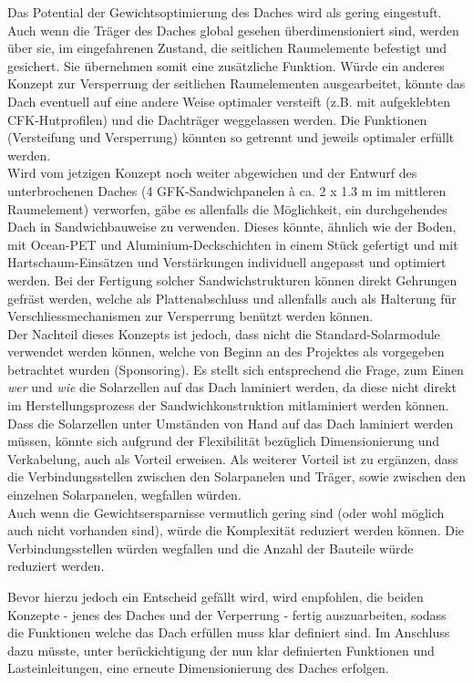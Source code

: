 Das Potential der Gewichtsoptimierung des Daches wird als gering eingestuft. Auch wenn die Träger des Daches global gesehen überdimensioniert sind, werden über sie, im eingefahrenen Zustand, die seitlichen Raumelemente befestigt und gesichert. Sie übernehmen somit eine zusätzliche Funktion. Würde ein anderes Konzept zur Versperrung der seitlichen Raumelementen ausgearbeitet, könnte das Dach eventuell auf eine andere Weise optimaler versteift (z.B. mit aufgeklebten CFK-Hutprofilen) und die Dachträger weggelassen werden. Die Funktionen (Versteifung und Versperrung) könnten so getrennt und jeweils optimaler erfüllt werden.\\
Wird vom jetzigen Konzept noch weiter abgewichen und der Entwurf des unterbrochenen Daches (4 GFK-Sandwichpanelen à ca. 2 x 1.3 m im mittleren Raumelement) verworfen, gäbe es allenfalls die Möglichkeit, ein durchgehendes Dach in Sandwichbauweise zu verwenden. Dieses könnte, ähnlich wie der Boden, mit Ocean-PET und Aluminium-Deckschichten in einem Stück gefertigt und mit Hartschaum-Einsätzen und Verstärkungen individuell angepasst und optimiert werden.
Bei der Fertigung solcher Sandwichstrukturen können direkt Gehrungen gefräst werden, welche als Plattenabschluss und allenfalls auch als Halterung für Verschliessmechanismen zur Versperrung benützt werden können.\\
Der Nachteil dieses Konzepts ist jedoch, dass nicht die Standard-Solarmodule verwendet werden können, welche von Beginn an des Projektes als vorgegeben betrachtet wurden (Sponsoring). Es stellt sich entsprechend die Frage, zum Einen \emph{wer} und \emph{wie} die Solarzellen auf das Dach laminiert werden, da diese nicht direkt im Herstellungsprozess der Sandwichkonstruktion mitlaminiert werden können. Dass die Solarzellen unter Umständen \glqq von Hand\grqq{} auf das Dach laminiert werden müssen, könnte sich aufgrund der Flexibilität bezüglich Dimensionierung und Verkabelung, auch als Vorteil erweisen. Als weiterer Vorteil ist zu ergänzen, dass die Verbindungsstellen zwischen den Solarpanelen und Träger, sowie zwischen den einzelnen Solarpanelen, wegfallen würden.\\
Auch wenn die Gewichtsersparnisse vermutlich gering sind (oder wohl möglich auch nicht vorhanden sind), würde die Komplexität reduziert werden können. Die Verbindungsstellen würden wegfallen und die Anzahl der Bauteile würde reduziert werden.

Bevor hierzu jedoch ein Entscheid gefällt wird, wird empfohlen, die beiden Konzepte - jenes des Daches und der Verperrung - fertig auszuarbeiten, sodass die Funktionen welche das Dach erfüllen muss klar definiert sind. Im Anschluss dazu müsste, unter berückichtigung der nun klar definierten Funktionen und Lasteinleitungen, eine erneute Dimensionierung des Daches erfolgen.

